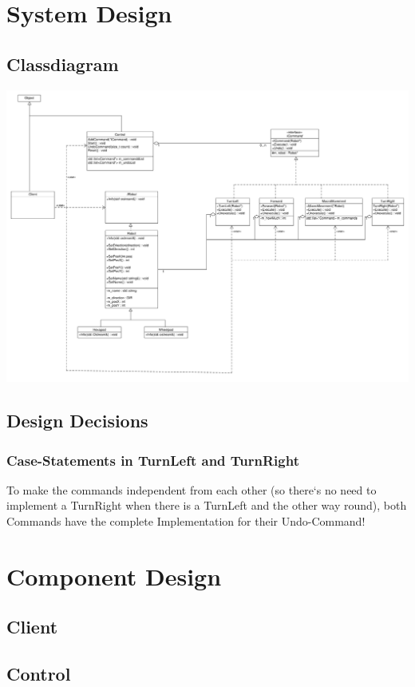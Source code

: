 \section{System Design}
\newpage
\subsection{Classdiagram}
\includegraphics[scale=0.35, angle=90]{../ClassDiagram.pdf}

\subsection{Design Decisions}
\subsubsection{Case-Statements in TurnLeft and TurnRight}
To make the commands independent from each other (so there`s no need to implement a TurnRight when there is a TurnLeft and the other way round), both Commands have the complete Implementation for their Undo-Command!

\section{Component Design}
\subsection{Client}

\subsection{Control}

